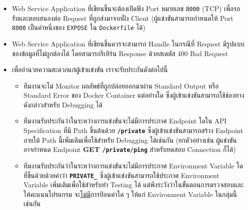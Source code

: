 \begin{itemize}
    \item
        Web Service Application ที่เขียนขึ้นจะต้องเปิดฟัง Port หมายเลข \verb'8000' (TCP) เพื่อรอรับและตอบสนองต่อ Request ที่ถูกส่งมาจากฝั่ง Client \;
        (ผู้แข่งขันสามารถกำหนดให้ Port \verb'8000' เป็นค่าหนึ่งของ \verb'EXPOSE' ใน \verb'Dockerfile' ได้)
    \item
        Web Service Application ที่เขียนขึ้นควรจะสามารถ Handle ในกรณีที่ Request มีรูปแบบของข้อมูลที่ไม่ถูกต้องได้ โดยสามารถรีเทิร์น Response ด้วยสเตตัส 400 Bad Request
    \item
        เพื่ออำนวยความสะดวกแก่ผู้เข้าแข่งขัน เราจะรับประกันดังต่อไปนี้
        \begin{itemize}[topsep=0pc,itemsep=0pc]
            \item
                ทีมงานจะไม่ Monitor ผลลัพธ์ที่ถูกปล่อยออกมาผ่าน Standard Output หรือ Standard Error ของ Docker Container แต่อย่างใด ซึ่งผู้เข้าแข่งขันสามารถใช้ช่องทางดังกล่าวสำหรับ Debugging ได้
            \item
                ทีมงานรับประกันว่าในระหว่างการแข่งขันจะไม่มีการประกาศ Endpoint ใดใน API Specification ที่มี Path ขึ้นต้นด้วย \textbf{\texttt{/private}} ซึ่งผู้เข้าแข่งขันสามารถสร้าง Endpoint ภายใต้ Path นี้เพิ่มเติมเพื่อใช้สำหรับ Debugging ได้เช่นกัน \;
                (ยกตัวอย่างเช่น ผู้แข่งขันอาจกำหนด Endpoint \textbf{GET \texttt{/private/ping}} สำหรับทดสอบ Connection ก็ได้)
            \item
                ทีมงานรับประกันว่าในระหว่างการแข่งขันจะไม่มีการประกาศ Environment Variable ใดที่ขึ้นด้วยด้วยคำว่า \textbf{\texttt{PRIVATE\_}} ซึ่งผู้เข้าแข่งขันสามารถใช้ประกาศ Environment Variable เพิ่มเติมเพื่อใช้สำหรับทำ Testing ได้ \;
                แต่พึงระวังว่าในขั้นตอนการตรวจสอบและให้คะแนนโปรแกรม จะ\uline{ไม่มี}การป้อนค่าใด ๆ ให้แก่ Environment Variable ในกลุ่มนี้เช่นกัน
        \end{itemize}
\end{itemize}
